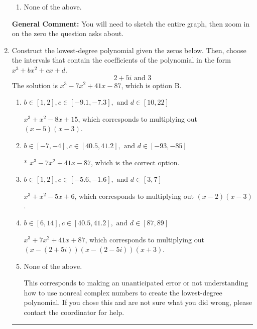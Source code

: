 \documentclass{extbook}[14pt]
\newcommand{\litem}[1]{\item #1

\rule{\textwidth}{0.4pt}}
\begin{document}
\begin{enumerate}
{\begin{enumerate}[label=\Alph*.]
\item None of the above.\end{enumerate}
\textbf{General Comment:} You will need to sketch the entire graph, then zoom in on the zero the question asks about.
}
\litem{
Construct the lowest-degree polynomial given the zeros below. Then, choose the intervals that contain the coefficients of the polynomial in the form $x^3+bx^2+cx+d$.
\[ 2 + 5 i \text{ and } 3 \]
The solution is \( x^{3} -7 x^{2} +41 x -87 \), which is option B.\begin{enumerate}[label=\Alph*.]
\item \( b \in [1, 2], c \in [-9.1, -7.3], \text{ and } d \in [10, 22] \)

$x^{3} + x^{2} -8 x + 15$, which corresponds to multiplying out $(x -5)(x -3)$.
\item \( b \in [-7, -4], c \in [40.5, 41.2], \text{ and } d \in [-93, -85] \)

* $x^{3} -7 x^{2} +41 x -87$, which is the correct option.
\item \( b \in [1, 2], c \in [-5.6, -1.6], \text{ and } d \in [3, 7] \)

$x^{3} + x^{2} -5 x + 6$, which corresponds to multiplying out $(x -2)(x -3)$.
\item \( b \in [6, 14], c \in [40.5, 41.2], \text{ and } d \in [87, 89] \)

$x^{3} +7 x^{2} +41 x + 87$, which corresponds to multiplying out $(x-(2 + 5 i))(x-(2 - 5 i))(x + 3)$.
\item \( \text{None of the above.} \)

This corresponds to making an unanticipated error or not understanding how to use nonreal complex numbers to create the lowest-degree polynomial. If you chose this and are not sure what you did wrong, please contact the coordinator for help.
\end{enumerate}

}
\end{enumerate}
\end{document}
